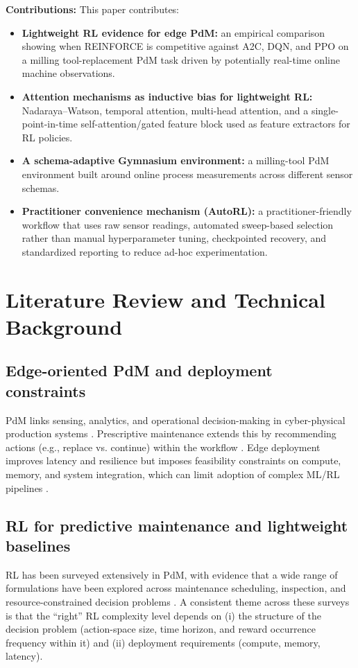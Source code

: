 \documentclass[sn-vancouver-num]{sn-jnl}%
\begin{document}
\textbf{Contributions:}
This paper contributes:
\begin{itemize}
    \item \textbf{Lightweight RL evidence for edge PdM:} an empirical comparison showing when \textsc{REINFORCE} is competitive against \textsc{A2C}, \textsc{DQN}, and \textsc{PPO} on a milling tool-replacement PdM task driven by potentially real-time online machine observations.
    \item \textbf{Attention mechanisms as inductive bias for lightweight RL:} Nadaraya--Watson, temporal attention, multi-head attention, and a single-point-in-time self-attention/gated feature block used as feature extractors for RL policies.
    \item \textbf{A schema-adaptive Gymnasium environment:} a milling-tool PdM environment built around online process measurements across different sensor schemas.
    \item \textbf{Practitioner convenience mechanism (AutoRL):} a practitioner-friendly workflow that uses raw sensor readings, automated sweep-based selection rather than manual hyperparameter tuning, checkpointed recovery, and standardized reporting to reduce ad-hoc experimentation.
\end{itemize}

\section{Literature Review and Technical Background}
\label{sec:lit_tech}
\subsection{Edge-oriented PdM and deployment constraints}
PdM links sensing, analytics, and operational decision-making in cyber-physical production systems \cite{Compare2020, Zonta2020}. Prescriptive maintenance extends this by recommending actions (e.g., replace vs. continue) within the workflow \cite{Ansari2019}. Edge deployment improves latency and resilience but imposes feasibility constraints on compute, memory, and system integration, which can limit adoption of complex ML/RL pipelines \cite{Njor2024, Pandey2023}.

\subsection{RL for predictive maintenance and lightweight baselines}
RL has been surveyed extensively in PdM, with evidence that a wide range of formulations have been explored across maintenance scheduling, inspection, and resource-constrained decision problems \cite{Siraskar2023, Ogunfowora2023, Zhang2024}. A consistent theme across these surveys is that the ``right'' RL complexity level depends on (i) the structure of the decision problem (action-space size, time horizon, and reward occurrence frequency within it) and (ii) deployment requirements (compute, memory, latency).
\end{document}
